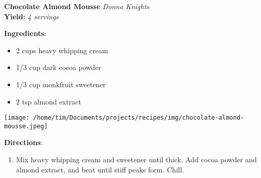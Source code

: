 \documentclass[11pt, twoside, openany]{book}
\begin{document}
\noindent\begin{minipage}[t]{\linewidth}%
{\Large\textbf{Chocolate Almond Mousse}} \label{chocolate-almond-mousse}\hfill\textit{Donna Knights}\\
\textbf{Yield:} \textit{4 servings}\\
\noindent\begin{minipage}[t]{0.78\linewidth}%
\textbf{Ingredients}:\vspace{-3mm}
\begin{multicols}{2}
\begin{itemize}\setlength\itemsep{-1mm}
\item 2 cups heavy whipping cream
\item 1/3 cup dark cocoa powder
\item 1/3 cup monkfruit sweetener
\item 2 tsp almond extract
\end{itemize}
\end{multicols}
\end{minipage}
\noindent\begin{minipage}[t]{0.18\linewidth}
\centering \strut\vspace*{-\baselineskip}\newline
\texttt{[image: /home/tim/Documents/projects/recipes/img/chocolate-almond-mousse.jpeg]}\\
\end{minipage}\vspace{3mm}
\textbf{Directions}:
\vspace{-3mm}\begin{enumerate}\setlength\itemsep{-1mm}
\item Mix heavy whipping cream and sweetener until thick. Add cocoa powder and almond extract, and beat until stiff peaks form. Chill.
\end{enumerate}
\end{minipage}\vspace{8mm}
\end{document}
